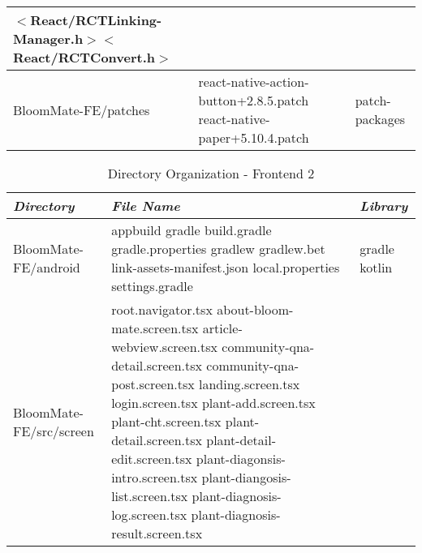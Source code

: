 \documentclass[conference, a4paper]{IEEEtran}
\begin{document}
\begin{table} [htp]
\begin{tabular}{p{1.7cm}|p{2.8cm}|p{2.5cm}}
    \newline $<$React/RCTLinking-Manager.h$>$\newline $<$React/RCTConvert.h$>$ \\
    \hline
        BloomMate-FE\newline/patches & react-native-action-button+2.8.5.patch \newline
    react-native-paper+5.10.4.patch & patch-packages \\
    \hline
    \end{tabular}
\end{table}

\begin{table} [htp]
    \caption{Directory Organization - Frontend 2}
    \centering
    \renewcommand{\arraystretch}{1.3}
    \begin{tabular}{p{1.7cm}|p{2.8cm}|p{2.5cm}}
    \hline
    \textit{\textbf{Directory}} & \textit{\textbf{File Name}} & \textit{\textbf{Library}} \\
    \hline 
    BloomMate-FE\newline/android & app\newline build \newline gradle \newline build.gradle \newline gradle.properties \newline gradlew \newline gradlew.bet \newline link-assets-manifest.json \newline local.properties \newline settings.gradle & gradle \newline kotlin \\
    \hline
 BloomMate-FE\newline/src/screen & root.navigator.tsx \newline  \newline about-bloom-mate.screen.tsx
 \newline article-webview.screen.tsx \newline community-qna-detail.screen.tsx \newline community-qna-post.screen.tsx \newline landing.screen.tsx \newline login.screen.tsx \newline plant-add.screen.tsx \newline plant-cht.screen.tsx \newline plant-detail.screen.tsx \newline plant-detail-edit.screen.tsx \newline plant-diagonsis-intro.screen.tsx \newline plant-diangosis-list.screen.tsx \newline plant-diagnosis-log.screen.tsx \newline plant-diagnosis-result.screen.tsx

\end{tabular}
\end{table}
\end{document}
